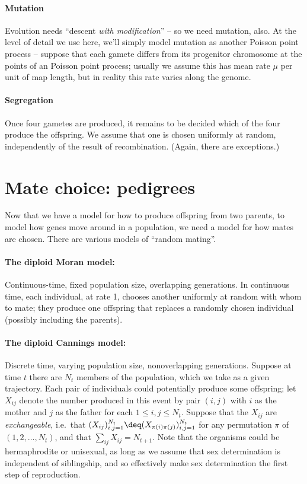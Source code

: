 \paragraph{Mutation}
Evolution needs ``descent \emph{with modification}'' -- so we need mutation, also.
At the level of detail we use here, we'll simply model mutation as another Poisson point process --
suppose that each gamete differs from its progenitor chromosome at the points of an Poisson point process;
usually we assume this has mean rate $\mu$ per unit of map length,
but in reality this rate varies along the genome.

\paragraph{Segregation}
Once four gametes are produced, it remains to be decided which of the four produce the offspring.
We assume that one is chosen uniformly at random,
independently of the result of recombination.
(Again, there are exceptions.)


\section{Mate choice: pedigrees}

Now that we have a model for how to produce offspring from two parents,
to model how genes move around in a population,
we need a model for how mates are chosen.
There are various models of ``random mating''.

\paragraph{The diploid Moran model:}
Continuous-time, fixed population size, overlapping generations.
In continuous time, each individual, at rate 1, chooses another uniformly at random
with whom to mate;
they produce one offspring
that replaces a randomly chosen individual (possibly including the parents).

\paragraph{The diploid Cannings model:}
Discrete time, varying population size, nonoverlapping generations.
Suppose at time $t$ there are $N_t$ members of the population,
which we take as a given trajectory.
Each pair of individuals could potentially produce some offspring;
let $X_{ij}$ denote the number produced in this event by pair $(i,j)$ with $i$ as the mother and $j$ as the father for each $1 \le i,j \le N_{t}$.
Suppose that the $X_{ij}$ are \emph{exchangeable},
i.e.\ that $(X_{ij})_{i,j=1}^{N_{t}} \deq (X_{\pi(i)\pi(j)})_{i,j=1}^{N_{t}}$ for any permutation $\pi$ of $(1,2,\ldots,N_{t})$,
and that $\sum_{ij} X_{ij} = N_{t+1}$.
Note that the organisms could be hermaphrodite or unisexual,
as long as we assume that sex determination is independent of siblingship,
and so effectively make sex determination the first step of reproduction.


